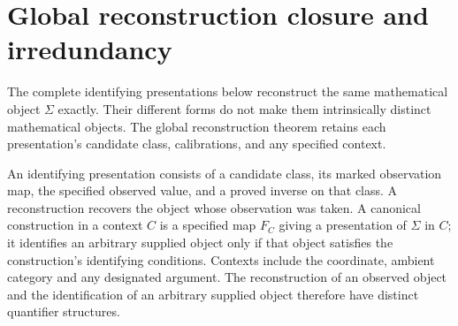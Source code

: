 \section{Global reconstruction closure and irredundancy}
\label{final:closure}

The complete identifying presentations below reconstruct the same
mathematical object $\Sigma$ exactly. Their different forms do not
make them intrinsically distinct mathematical objects. The global
reconstruction theorem retains each presentation's candidate class,
calibrations, and any specified context.

\begin{definition}
\label{final:identification}
An identifying presentation consists of a candidate class, its marked
observation map, the specified observed value, and a proved inverse on
that class. A reconstruction recovers the object whose observation was
taken. A canonical construction in a context $C$ is a specified map
$F_C$ giving a presentation of $\Sigma$ in $C$; it identifies an arbitrary supplied
object only if that object satisfies the construction's identifying
conditions. Contexts include the coordinate, ambient category and any
designated argument. The reconstruction of an observed object and the
identification of an arbitrary supplied object therefore have distinct
quantifier structures.
\end{definition}

